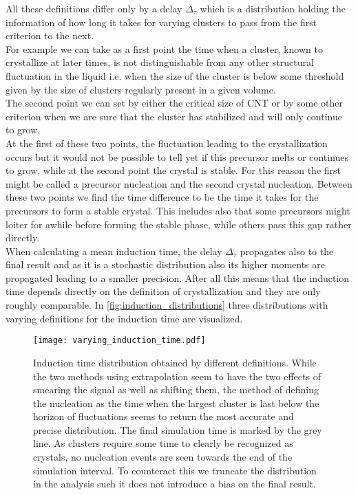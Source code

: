 All these definitions differ only by a delay $\Delta_{\tau}$ which is a distribution holding the information of how long it takes for varying clusters to pass from the first criterion to the next.\\
For example we can take as a first point the time when a cluster, known to crystallize at later times, is not distinguishable from any other structural fluctuation in the liquid i.e. when the size of the cluster is below some threshold given by the size of clusters regularly present in a given volume.\\
The second point we can set by either the critical size of CNT or by some other criterion when we are sure that the cluster has stabilized and will only continue to grow.\\
At the first of these two points, the fluctuation leading to the crystallization occurs but it would not be possible to tell yet if this precursor melts or continues to grow, while at the second point the crystal is stable. For this reason the first might be called a precursor nucleation and the second crystal nucleation. Between these two points we find the time difference to be the time it takes for the precursors to form a stable crystal. This includes also that some precursors might loiter for awhile before forming the stable phase, while others pass this gap rather directly.\\

When calculating a mean induction time, the delay $\Delta_{\tau}$ propagates also to the final result and as it is a stochastic distribution also its higher moments are propagated leading to a smaller precision. After all this means that the induction time depends directly on the definition of crystallization and they are only roughly comparable. In \autoref{fig:induction_distributions} three distributions with varying definitions for the induction time are visualized.

\begin{figure}[!h]
\centering
\texttt{[image: varying\_induction\_time.pdf]}
\caption[Comparison of different definitions for the induction time]{Induction time distribution obtained by different definitions. While the two methods using extrapolation seem to have the two effects of smearing the signal as well as shifting them, the method of defining the nucleation as the time when the largest cluster is last below the horizon of fluctuations seems to return the most accurate and precise distribution. The final simulation time is marked by the grey line. As clusters require some time to clearly be recognized as crystals, no nucleation events are seen towards the end of the simulation interval. To counteract this we truncate the distribution in the analysis such it does not introduce a bias on the final result.}
\label{fig:induction_distributions}
\end{figure}

